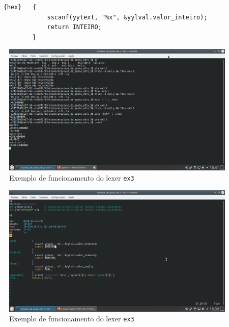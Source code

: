 \documentclass{article}
\begin{document}
\begin{verbatim}
    {hex}   {
                sscanf(yytext, "%x", &yylval.valor_inteiro);
                return INTEIRO;
            }
\end{verbatim}

\begin{figure}[!ht]
    \begin{center}
        \includegraphics[width=\textwidth]{images/ex3_c_2.png}
        \caption{Exemplo de funcionamento do lexer \texttt{ex3}}
    \end{center}
\end{figure} 

\begin{figure}[!ht]
    \begin{center}
        \includegraphics[width=\textwidth]{images/ex3_c_1.png}
        \caption{Exemplo de funcionamento do lexer \texttt{ex3}}
    \end{center}
\end{figure} 
\end{document}
